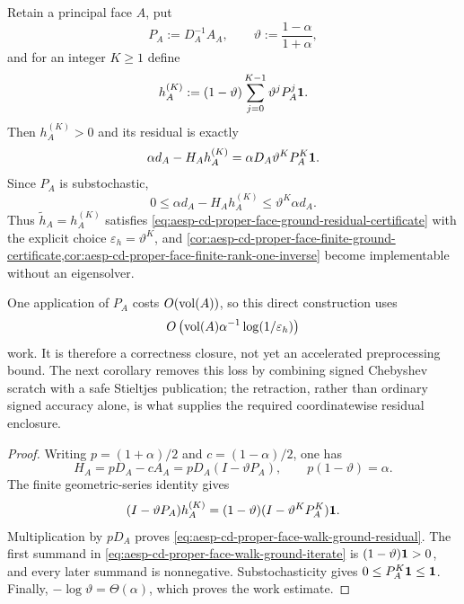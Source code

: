 \begin{proposition}
\label{prop:aesp-cd-proper-face-walk-ground-certificate}
Retain a principal face \(A\), put
\begin{equation*}
 P_A:=D_A^{-1}A_A,
 \qquad
 \vartheta:=\frac{1-\alpha}{1+\alpha},
\end{equation*}
and for an integer \(K\geq1\) define
\begin{equation}
 h_A^{(K)}
 :=(1-\vartheta)\sum_{j=0}^{K-1}\vartheta^jP_A^j\mathbf{1} .
 \label{eq:aesp-cd-proper-face-walk-ground-iterate}
\end{equation}
Then \(h_A^{(K)}>0\) and its residual is exactly
\begin{equation}
 \alpha d_A-H_Ah_A^{(K)}
 =\alpha D_A\vartheta^KP_A^K\mathbf{1}.
 \label{eq:aesp-cd-proper-face-walk-ground-residual}
\end{equation}
Since \(P_A\) is substochastic,
\begin{equation*}
 0\leq\alpha d_A-H_Ah_A^{(K)}
 \leq\vartheta^K\alpha d_A.
\end{equation*}
Thus \(\widetilde h_A=h_A^{(K)}\) satisfies
\cref{eq:aesp-cd-proper-face-ground-residual-certificate} with the explicit
choice \(\varepsilon_h=\vartheta^K\), and
\cref{cor:aesp-cd-proper-face-finite-ground-certificate,cor:aesp-cd-proper-face-finite-rank-one-inverse}
become implementable without
an eigensolver.

One application of \(P_A\) costs \(O(\operatorname{vol}(A))\), so this direct construction
uses
\begin{equation}
 O\left(
   \operatorname{vol}(A)\alpha^{-1}\log(1/\varepsilon_h)
 \right)
 \label{eq:aesp-cd-proper-face-walk-ground-work}
\end{equation}
work.  It is therefore a correctness closure, not yet an accelerated
preprocessing bound.  The next corollary removes this loss by combining
signed Chebyshev scratch with a safe Stieltjes publication; the retraction,
rather than ordinary signed accuracy alone, is what supplies the required
coordinatewise residual enclosure.
\end{proposition}

\begin{proof}
Writing \(p=(1+\alpha)/2\) and \(c=(1-\alpha)/2\), one has
\begin{equation*}
 H_A=pD_A-cA_A=pD_A(I-\vartheta P_A),
 \qquad
 p(1-\vartheta)=\alpha.
\end{equation*}
The finite geometric-series identity gives
\begin{equation*}
 (I-\vartheta P_A)h_A^{(K)}
 =(1-\vartheta)(I-\vartheta^KP_A^K)\mathbf{1}.
\end{equation*}
Multiplication by \(pD_A\) proves
\cref{eq:aesp-cd-proper-face-walk-ground-residual}.  The first summand in
\cref{eq:aesp-cd-proper-face-walk-ground-iterate} is
\((1-\vartheta)\mathbf{1}>0\), and every later summand is nonnegative.
Substochasticity gives \(0\leq P_A^K\mathbf{1}\leq\mathbf{1}\).
Finally, \(-\log\vartheta=\Theta(\alpha)\), which proves the work estimate.
\end{proof}

